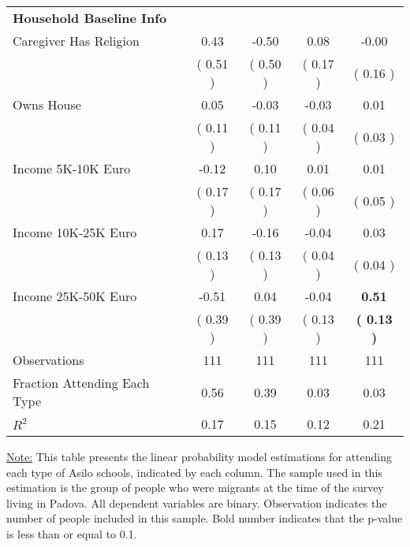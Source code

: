 \begin{table}[H]
{\begin{tabular}{lcccc}
\midrule
\textbf{Household Baseline Info} \\
\quad Caregiver Has Religion &      0.43 &     -0.50 &      0.08 &     -0.00 \\
\quad  & (     0.51 ) & (     0.50 )  & (     0.17 )  & (     0.16 )  \\
\quad Owns House &      0.05 &     -0.03 &     -0.03 &      0.01 \\
\quad  & (     0.11 ) & (     0.11 )  & (     0.04 )  & (     0.03 )  \\
\quad Income 5K-10K Euro &     -0.12 &      0.10 &      0.01 &      0.01 \\
\quad  & (     0.17 ) & (     0.17 )  & (     0.06 )  & (     0.05 )  \\
\quad Income 10K-25K Euro &      0.17 &     -0.16 &     -0.04 &      0.03 \\
\quad  & (     0.13 ) & (     0.13 )  & (     0.04 )  & (     0.04 )  \\
\quad Income 25K-50K Euro &     -0.51 &      0.04 &     -0.04 & \textbf{     0.51} \\
\quad  & (     0.39 ) & (     0.39 )  & (     0.13 )  & \textbf{(     0.13 )}  \\
\midrule
Observations & 111 & 111 & 111 & 111 \\
Fraction Attending Each Type &      0.56 &      0.39 &      0.03 &      0.03 \\
\midrule
$ R^2$ &      0.17 &      0.15 &      0.12 &      0.21 \\
\bottomrule
\end{tabular}}
\end{table}
\begin{footnotesize}
\noindent\underline{Note:} This table presents the linear probability model estimations for attending each type of Asilo schools, indicated by each column. The sample used in this estimation is the group of people who were migrants at the time of the survey living in Padova. All dependent variables are binary. Observation indicates the number of people included in this sample. Bold number indicates that the p-value is less than or equal to 0.1.
\end{footnotesize}
